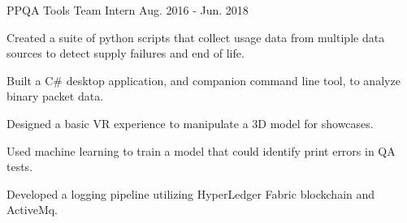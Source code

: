 \begin{cventries}
  \cventry
    {PPQA Tools Team Intern} %
    { } %
    { } %
    {Aug. 2016 - Jun. 2018} %
    {
      \begin{cvitems} %
        \item {Created a suite of python scripts that collect usage data from multiple data sources to detect supply failures and end of life.}
        \item {Built a C\# desktop application, and companion command line tool, to analyze binary packet data.}
        \item {Designed a basic VR experience to manipulate a 3D model for showcases.}
        \item {Used machine learning to train a model that could identify print errors in QA tests.}
        \item {Developed a logging pipeline utilizing HyperLedger Fabric blockchain and ActiveMq.}
      \end{cvitems}
    }

\end{cventries}
